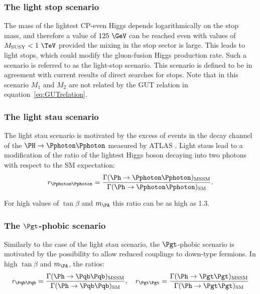 \subsubsection{The light stop scenario}
\label{sec:lightstopscenario}

The mass of the lightest CP-even Higgs depends logarithmically on the stop mass,
and therefore a value of $125~\GeV$ can be reached even with values of
$M_{\text{SUSY}} < 1~\TeV$ provided the mixing in the stop sector is large. This
leads to light stops, which could modify the gluon-fusion Higgs production rate.
Such a scenario is referred to as the light-stop scenario. This scenario is
defined to be in agreement with current results of direct searches for stops.
Note that in this scenario $M_{1}$ and $M_{2}$ are not related by the GUT
relation in equation~\ref{eq:GUTrelation}. 

\subsubsection{The light stau scenario}
\label{sec:lightstauscenario}

The light stau scenario is motivated by the excess of events in the decay
channel of the $\PH\to\Pphoton\Pphoton$ measured by ATLAS
\cite{ATLAS-CONF-2013-012}. Light staus
lead to a modification of the ratio of the lightest Higgs boson decaying into
two photons with respect to the \ac{SM} expectation:
\begin{equation}
r_{\Pphoton\Pphoton} =
\frac{\Gamma(\Ph\to\Pphoton\Pphoton)_{\text{MSSM}}}{\Gamma(\Ph\to\Pphoton\Pphoton)_{\text{SM}}}
.
\end{equation}

For high values of $\tan\beta$ and $m_{\PA}$ this ratio can be as high as 1.3. 

\subsubsection{The $\Pgt$-phobic scenario}
\label{sec:tauphobicscenario}

Similarly to the case of the light stau scenario, the $\Pgt$-phobic scenario is
motivated by the possibility to allow reduced couplings to down-type fermions.
In high $\tan\beta$ and $m_{\PA}$, the ratios:
\begin{equation}
r_{\Pqb\Pqb} =
\frac{\Gamma(\Ph\to\Pqb\Pqb)_{\text{MSSM}}}{\Gamma(\Ph\to\Pqb\Pqb)_{\text{SM}}}
, \quad
r_{\Pgt\Pgt} =
\frac{\Gamma(\Ph\to\Pgt\Pgt)_{\text{MSSM}}}{\Gamma(\Ph\to\Pgt\Pgt)_{\text{SM}}}
\end{equation}


